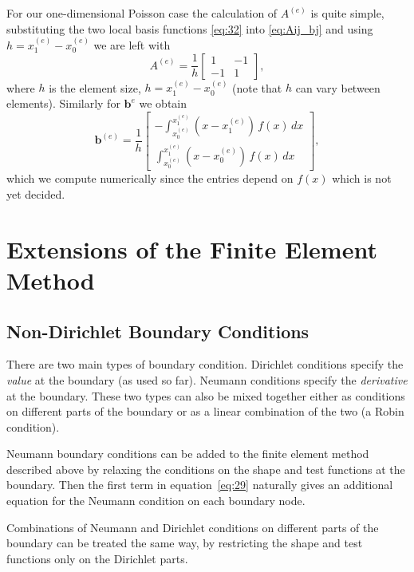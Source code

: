 For our one-dimensional Poisson case the calculation of $A^{(e)}$ is quite
simple, substituting the two local basis functions \eqref{eq:32} into
\eqref{eq:Aij_bj} and using $h=x_{1}^{(e)}-x_{0}^{(e)}$ we are left with
\begin{equation*}
  A^{(e)} = \dfrac{1}{h}
  \left[
    \begin{array}{cc}
      1 & -1 \\ -1 & 1
    \end{array}
  \right],
\end{equation*}
where $h$ is the element size, $h = x_{1}^{(e)}-x_{0}^{(e)}$ (note that $h$ can
vary between elements). Similarly for $\mathbf{b}^{{e}}$ we obtain
\begin{equation*}
  \mathbf{b}^{(e)}=\dfrac{1}{h}\left[
    \begin{array}{c}
      -\int_{x_{0}^{(e)}}^{x_{1}^{(e)}}(x-x_{1}^{(e)})\, f(x)\, dx\\
      \int_{x_{0}^{(e)}}^{x_{1}^{(e)}}(x-x_{0}^{(e)})\, f(x)\, dx
    \end{array}\right],
\end{equation*}
which we compute numerically since the entries depend on $f(x)$ which is not yet
decided.


\section{Extensions of the Finite Element Method}

\subsection{Non-Dirichlet Boundary Conditions}
\label{sub:Non-Dirichlet-Boundary-Conditions}

There are two main types of boundary condition. Dirichlet conditions specify the
\emph{value} at the boundary (as used so far). Neumann conditions specify the
\emph{derivative} at the boundary. These two types can also be mixed together
either as conditions on different parts of the boundary or as a linear
combination of the two (a Robin condition).

Neumann boundary conditions can be added to the finite element method described
above by relaxing the conditions on the shape and test functions at the
boundary. Then the first term in equation~\eqref{eq:29} naturally gives an
additional equation for the Neumann condition on each boundary node.

Combinations of Neumann and Dirichlet conditions on different parts of the boundary can be treated the same way, by restricting the shape and test functions only on the Dirichlet parts.


